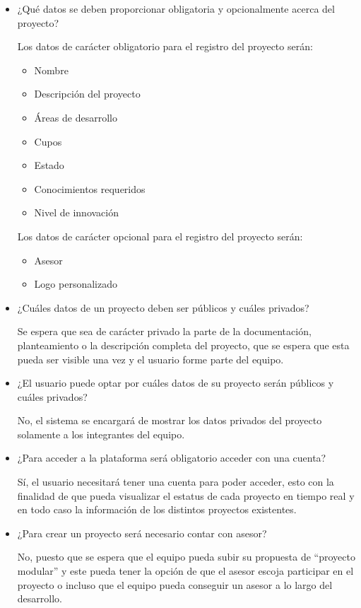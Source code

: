 	\begin{itemize}
		\item ¿Qué datos se deben proporcionar obligatoria y opcionalmente acerca del proyecto?

			Los datos de carácter obligatorio para el registro del proyecto serán:

			\begin{itemize}
				\item Nombre

				\item Descripción del proyecto

				\item Áreas de desarrollo

				\item Cupos

				\item Estado

				\item Conocimientos requeridos

				\item Nivel de innovación
			\end{itemize}

			Los datos de carácter opcional para el registro del proyecto serán:

			\begin{itemize}
				\item Asesor

				\item Logo personalizado
			\end{itemize}

		\item ¿Cuáles datos de un proyecto deben ser públicos y cuáles privados?

			Se espera que sea de carácter privado la parte de la documentación,
			planteamiento o la descripción completa del proyecto, que se espera que esta
			pueda ser visible una vez y el usuario forme parte del equipo.

		\item ¿El usuario puede optar por cuáles datos de su proyecto serán públicos y
			cuáles privados?

			No, el sistema se encargará de mostrar los datos privados del proyecto
			solamente a los integrantes del equipo.

		\item ¿Para acceder a la plataforma será obligatorio acceder con una cuenta?

			Sí, el usuario necesitará tener una cuenta para poder acceder, esto con la finalidad
			de que pueda visualizar el estatus de cada proyecto en tiempo real y en todo
			caso la información de los distintos proyectos existentes.

		\item ¿Para crear un proyecto será necesario contar con asesor?

			No, puesto que se espera que el equipo pueda subir su propuesta de ``proyecto
			modular'' y este pueda tener la opción de que el asesor escoja participar en
			el proyecto o incluso que el equipo pueda conseguir un asesor a lo largo del
			desarrollo.
	\end{itemize}

